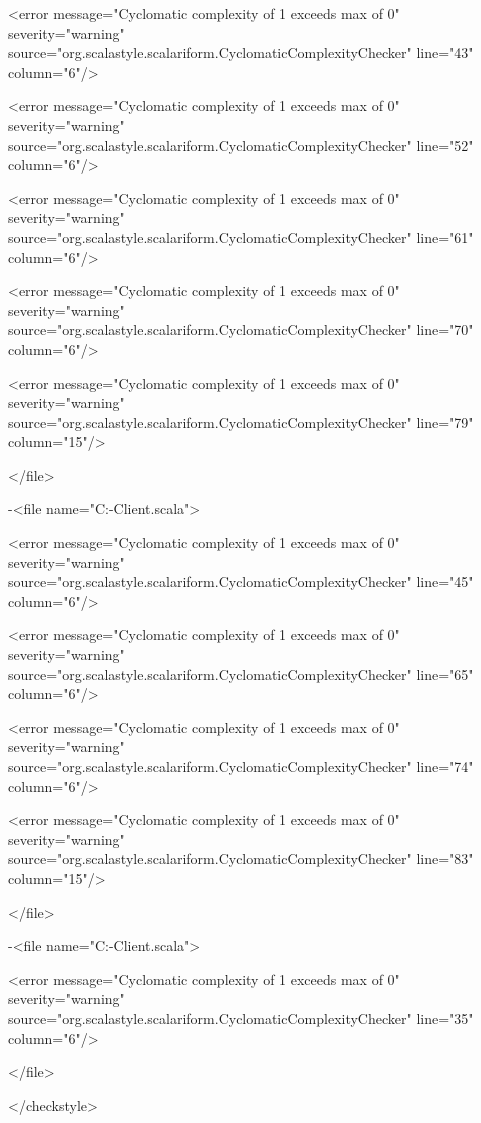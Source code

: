 \documentclass{scalatekids-article}
\begin{document}
<error message="Cyclomatic complexity of 1 exceeds max of 0" severity="warning" source="org.scalastyle.scalariform.CyclomaticComplexityChecker" line="43" column="6"/>

<error message="Cyclomatic complexity of 1 exceeds max of 0" severity="warning" source="org.scalastyle.scalariform.CyclomaticComplexityChecker" line="52" column="6"/>

<error message="Cyclomatic complexity of 1 exceeds max of 0" severity="warning" source="org.scalastyle.scalariform.CyclomaticComplexityChecker" line="61" column="6"/>

<error message="Cyclomatic complexity of 1 exceeds max of 0" severity="warning" source="org.scalastyle.scalariform.CyclomaticComplexityChecker" line="70" column="6"/>

<error message="Cyclomatic complexity of 1 exceeds max of 0" severity="warning" source="org.scalastyle.scalariform.CyclomaticComplexityChecker" line="79" column="15"/>

</file>


-<file name="C:\Users\Davide\Documents\GitHub\Actorbase-Client\src\main\scala\com\actorbase\driver\data\ActorbaseObject.scala">

<error message="Cyclomatic complexity of 1 exceeds max of 0" severity="warning" source="org.scalastyle.scalariform.CyclomaticComplexityChecker" line="45" column="6"/>

<error message="Cyclomatic complexity of 1 exceeds max of 0" severity="warning" source="org.scalastyle.scalariform.CyclomaticComplexityChecker" line="65" column="6"/>

<error message="Cyclomatic complexity of 1 exceeds max of 0" severity="warning" source="org.scalastyle.scalariform.CyclomaticComplexityChecker" line="74" column="6"/>

<error message="Cyclomatic complexity of 1 exceeds max of 0" severity="warning" source="org.scalastyle.scalariform.CyclomaticComplexityChecker" line="83" column="15"/>

</file>


-<file name="C:\Users\Davide\Documents\GitHub\Actorbase-Client\src\main\scala\com\actorbase\cli\models\CommandInvoker.scala">

<error message="Cyclomatic complexity of 1 exceeds max of 0" severity="warning" source="org.scalastyle.scalariform.CyclomaticComplexityChecker" line="35" column="6"/>

</file>

</checkstyle>
\end{document}
